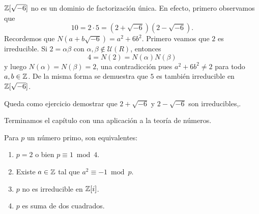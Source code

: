 

\begin{example}
$\mathbb{Z}[\sqrt{-6}]$ no es un dominio de factorización única. En efecto, primero observamos que 
\[
10=2\cdot 5=(2+\sqrt{-6})(2-\sqrt{-6}).
\]
Recordemos que $N(a+b\sqrt{-6})=a^2+6b^2$.	
Primero veamos que $2$ es irreducible. Si $2=\alpha\beta$ con $\alpha,\beta\not\in\mathcal{U}(R)$, entonces 
\[
4=N(2)=N(\alpha)N(\beta)
\]
y luego $N(\alpha)=N(\beta)=2$, una contradicción pues $a^2+6b^2\ne 2$ para todo $a,b\in\mathbb{Z}$. 
De la misma forma se demuestra que $5$ 
es también irreducible en $\mathbb{Z}[\sqrt{-6}]$. 

Queda como ejercicio demostrar que $2+\sqrt{-6}$ y $2-\sqrt{-6}$ son irreducibles,.
\end{example}


Terminamos el capítulo con una aplicación a la teoría de números.

\begin{theorem}[Fermat]
Para $p$ un número primo, son equivalentes:
\begin{enumerate}
	\item $p=2$ o bien $p\equiv1\bmod 4$.
	\item Existe $a\in\mathbb{Z}$ tal que $a^2\equiv-1\bmod p$.
	\item $p$ no es irreducible en $\mathbb{Z}[i]$.
	\item $p$ es suma de dos cuadrados.
\end{enumerate}	
\end{theorem}

